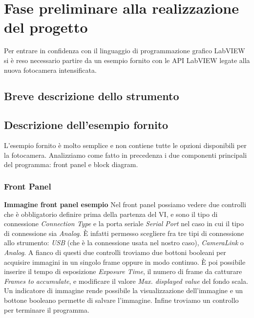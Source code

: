 \chapter{Fase preliminare alla realizzazione del progetto}
\thispagestyle{empty}

Per entrare in confidenza con il linguaggio di programmazione grafico LabVIEW si è reso necessario partire da un esempio fornito con le API LabVIEW legate alla nuova fotocamera intensificata.

\section{Breve descrizione dello strumento}

\section{Descrizione dell'esempio fornito}

L'esempio fornito è molto semplice e non contiene tutte le opzioni disponibili per la fotocamera. Analizziamo come fatto in precedenza i due componenti principali del programma: front panel e block diagram.

\subsection{Front Panel}
\textbf{Immagine front panel esempio}
Nel front panel possiamo vedere due controlli che è obbligatorio definire prima della partenza del VI, e sono il tipo di connessione \textit{Connection Type} e la porta seriale \textit{Serial Port} nel caso in cui il tipo di connessione sia \textit{Analog}. È infatti permesso scegliere fra tre tipi di connessione allo strumento: \textit{USB} (che è la connessione usata nel nostro caso), \textit{CameraLink} o \textit{Analog}. A fianco di questi due controlli troviamo due bottoni booleani per acquisire immagini in un singolo frame oppure in modo continuo. È poi possibile inserire il tempo di esposizione \textit{Exposure Time}, il numero di frame da catturare \textit{Frames to accumulate}, e modificare il valore \textit{Max. displayed value} del fondo scala. Un indicatore di immagine rende possibile la visualizzazione dell'immagine e un bottone booleano permette di salvare l'immagine. Infine troviamo un controllo per terminare il programma.

